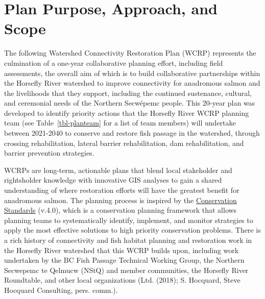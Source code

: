 \documentclass[
  letterpaper,
  DIV=11,
  numbers=noendperiod]{scrreprt}
\begin{document}

\section*{Plan Purpose, Approach, and
Scope}\label{plan-purpose-approach-and-scope}


The following Watershed Connectivity Restoration Plan (WCRP) represents
the culmination of a one-year collaborative planning effort, including
field assessments, the overall aim of which is to build collaborative
partnerships within the Horsefly River watershed to improve connectivity
for anadromous salmon and the livelihoods that they support, including
the continued sustenance, cultural, and ceremonial needs of the Northern
Secwépemc people. This 20-year plan was developed to identify priority
actions that the Horsefly River WCRP planning team (see
Table~\ref{tbl-planteam} for a list of team members) will undertake
between 2021-2040 to conserve and restore fish passage in the watershed,
through crossing rehabilitation, lateral barrier rehabilitation, dam
rehabilitation, and barrier prevention strategies.

WCRPs are long-term, actionable plans that blend local stakeholder and
rightsholder knowledge with innovative GIS analyses to gain a shared
understanding of where restoration efforts will have the greatest
benefit for anadromous salmon. The planning process is inspired by the
\href{https://cmp-openstandards.org/wp-content/uploads/2020/07/CMP-Open-Standards-for-the-Practice-of-Conservation-v4.0.pdf}{Conservation
Standards} (v.4.0), which is a conservation planning framework that
allows planning teams to systematically identify, implement, and monitor
strategies to apply the most effective solutions to high priority
conservation problems. There is a rich history of connectivity and fish
habitat planning and restoration work in the Horsefly River watershed
that this WCRP builds upon, including work undertaken by the BC Fish
Passage Technical Working Group, the Northern Secwepemc te Qelmucw
(NStQ) and member communities, the Horsefly River Roundtable, and other
local organizations (Ltd. (2018); S. Hocquard, Steve Hocquard
Consulting, pers. comm.).
\end{document}

